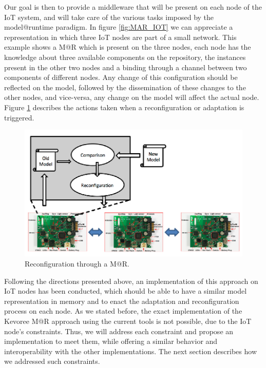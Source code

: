 Our goal is then to provide a middleware that will be present on each node of the IoT system, and will take care of the various tasks imposed by the model@runtime paradigm.
In figure \ref{fig:MAR_IOT} we can appreciate a representation in which three IoT nodes are part of a small network.
This example shows a M@R which is present on the three nodes, each node has the knowledge about three available components on the repository, the instances present in the other two nodes and a binding through a channel between two components of different nodes.
Any change of this configuration should be reflected on the model, followed by the dissemination of these changes to the other nodes, and vice-versa, any change on the model will affect the actual node.
Figure \ref{fig:MAR_reconfig} describes the actions taken when a reconfiguration or adaptation is triggered.

\begin{figure}[]
	\centering
	\includegraphics[width=1\columnwidth]{chapters/modelsAtRuntimeContiki.images/MAR_reconfig.pdf}
	\caption{Reconfiguration through a M@R.}
	\label{fig:MAR_reconfig}
\end{figure}

Following the directions presented above, an implementation of this approach on IoT nodes has been conducted, which should be able to have a similar model representation in memory and to enact the adaptation and reconfiguration process on each node.
As we stated before, the exact implementation of the Kevoree M@R approach using the current tools is not possible, due to the IoT node's constraints.
Thus, we will address each constraint and propose an implementation to meet them, while offering a similar behavior and interoperability with the other implementations.
The next section describes how we addressed such constraints.

